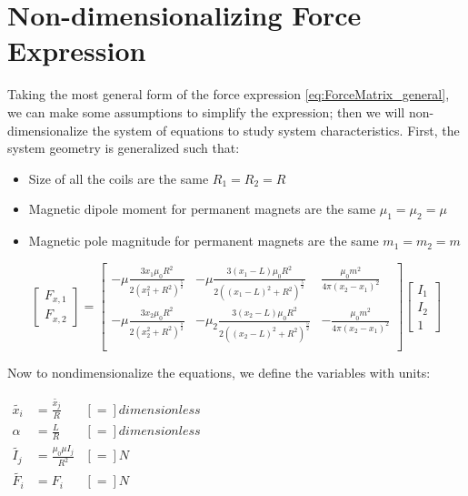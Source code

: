 \documentclass[english]{article}
\begin{document}
\section{Non-dimensionalizing Force Expression}
Taking the most general form of the force expression \ref{eq:ForceMatrix_general}, we can make some assumptions to simplify the expression; then we will non-dimensionalize the system of equations to study system characteristics.  First, the system geometry is generalized such that:

\begin{itemize}\itemsep1pt \parskip0pt 
\item{Size of all the coils are the same $R_1 = R_2 = R$}
\item{Magnetic dipole moment for permanent magnets are the same $\mu_1 = \mu_2 = \mu$}
\item{Magnetic pole magnitude for permanent magnets are the same $m_1 = m_2 = m$}
\end{itemize}


\begin{equation}
\begin{bmatrix}
	F_{x,1}\\[0.3em]
	F_{x,2}	
\end{bmatrix}
=
\begin{bmatrix}
			-\mu\frac{3 x_1 \mu_0 R^{2}}{2\left(x_1^2 + R^2 \right)^{\frac{5}{2}}}  & -\mu\frac{3 \left( x_1 - L \right) \mu_0 R^{2}}{2\left(\left(x_1 - L \right)^2 + R^2 \right)^{\frac{5}{2}}} & 	\frac{\mu_0 m^2}{4\pi \left(x_2-x_1\right)^2}\\
			-\mu\frac{3 x_2 \mu_0 R^{2}}{2\left(x_2^2 + R^2 \right)^{\frac{5}{2}}} & -\mu_2\frac{3 \left( x_2 - L \right) \mu_0 R^{2}}{2\left(\left(x_2 - L \right)^2 + R^2 \right)^{\frac{5}{2}}} & 	-\frac{\mu_0 m^2}{4\pi \left(x_2-x_1\right)^2}\\
\end{bmatrix}
\begin{bmatrix}
	I_1\\ I_2 \\ 1
\end{bmatrix}
\label{eq:ForceMatrix_assumptions}
\end{equation}

Now to nondimensionalize the equations, we define the variables with units:\\
\begin{center}
$\begin{array}{lll}
\tilde{x_i} &= \frac{\tilde{x_j}}{R} &\left[=\right] dimensionless\\
\alpha &= \frac{L}{R} &\left[=\right] dimensionless \\
\tilde{I_j} &= \frac{\mu_0 \mu I_j}{R^2} &\left[ = \right] N\\
\tilde{F_i} &= F_i &\left[ = \right] N
\end{array}$
\end{center}
\end{document}
